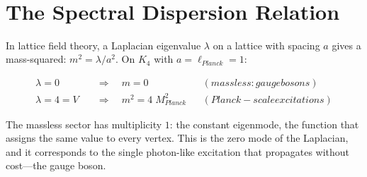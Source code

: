 \documentclass[11pt,a4paper]{book}
\def\text#1{#1}%
\begin{document}
\begin{code}
\AgdaSpace{}%
\AgdaSpace{}%
\<%
\\
%
\\[\AgdaEmptyExtraSkip]%
\>[0]\AgdaSpace{}%
\AgdaSymbol{:}\AgdaSpace{}%
\<%
\\
\>[0]\AgdaSpace{}%
\AgdaSymbol{=}\AgdaSpace{}%
\<%
\\
\>[0][@{}l@{\AgdaIndent{0}}]%
\>[2]\AgdaSymbol{\{}\AgdaSpace{}%
%
\>[26]\AgdaSymbol{=}\AgdaSpace{}%
\<%
\\
%
\>[2]\AgdaSymbol{;}\AgdaSpace{}%
%
\>[26]\AgdaSymbol{=}\AgdaSpace{}%
\<%
\\
%
\>[2]\AgdaSymbol{;}\AgdaSpace{}%
%
\>[26]\AgdaSymbol{=}\AgdaSpace{}%
\<%
\\
%
\>[2]\AgdaSymbol{;}\AgdaSpace{}%
\AgdaSpace{}%
\AgdaSymbol{=}\AgdaSpace{}%
\<%
\\
%
\>[2]\AgdaSymbol{;}\AgdaSpace{}%
%
\>[26]\AgdaSymbol{=}\AgdaSpace{}%
\AgdaSpace{}%
\AgdaSymbol{\}}\<%
\end{code}

\section{The Spectral Dispersion Relation}
\label{sec:spectral-dispersion}

In lattice field theory, a Laplacian eigenvalue $\lambda$ on a lattice with spacing $a$ gives a mass-squared: $m^2 = \lambda / a^2$. On $K_4$ with $a = \ell_{\text{Planck}} = 1$:

\begin{align}
  \lambda = 0 \quad &\Longrightarrow \quad m = 0 && \text{(massless: gauge bosons)} \\
  \lambda = 4 = V \quad &\Longrightarrow \quad m^2 = 4 \; M_{\text{Planck}}^2 && \text{(Planck-scale excitations)}
\end{align}

The massless sector has multiplicity $1$: the constant eigenmode, the function that assigns the same value to every vertex. This is the zero mode of the Laplacian, and it corresponds to the single photon-like excitation that propagates without cost---the gauge boson.
\end{document}
